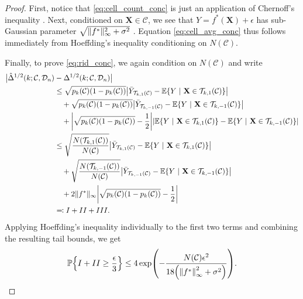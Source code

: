 \documentclass[11pt]{article}
\newcommand{\bX}{\mathbf{X}}
\DeclarePairedDelimiter{\braces}{\lbrace}{\rbrace}
\DeclarePairedDelimiter{\paren}{(}{)}
\DeclarePairedDelimiter{\abs}{|}{|}
\DeclarePairedDelimiter{\norm}{\|}{\|}
\renewcommand{\P}{\mathbb{P}}
\newcommand{\E}{\mathbb{E}}
\newcommand{\cell}{\mathcal{C}}
\newcommand{\data}[1][n]{\mathcal{D}_{#1}}
\newcommand{\splitoperator}{\mathcal{T}}
\newcommand{\rid}{\Delta^{1/2}}
\newcommand{\ridhat}{\hat\Delta^{1/2}}
\begin{document}
\begin{proof}
    First, notice that \eqref{eq:cell_count_conc} is just an application of Chernoff's inequality \citep{vershynin2018high}.
    Next, conditioned on $\bX \in \cell$, we see that $Y = f^*(\bX) + \epsilon$ has sub-Gaussian parameter $\sqrt{\norm{f^*}_\infty^2 + \sigma^2}$ \citep{wainwright2019high}.
    Equation \ref{eq:cell_avg_conc} thus follows immediately from Hoeffding's inequality conditioning on $N(\cell)$.
    
    Finally, to prove \eqref{eq:rid_conc}, we again condition on $N(\cell)$ and write
    \begin{equation} \nonumber
    \begin{split}
        \big|\ridhat(k;\cell,\data) & - \rid(k;\cell,\data)\big| \\
        & \leq \sqrt{p_k(\cell)(1-p_k(\cell))} \abs*{\bar Y_{\splitoperator_{k,1}(\cell)} - \E\braces*{Y~|~\bX \in \splitoperator_{k,1}(\cell)}} \\
        & \quad + \sqrt{p_k(\cell)(1-p_k(\cell))} \abs*{\bar Y_{\splitoperator_{k,-1}(\cell)} - \E\braces*{Y~|~\bX \in \splitoperator_{k,-1}(\cell)}} \\
        & \quad + \abs*{\sqrt{p_k(\cell)(1-p_k(\cell))} - \frac{1}{2}}\abs*{\E\braces*{Y~|~\bX \in \splitoperator_{k,1}(\cell)} - \E\braces*{Y~|~\bX \in \splitoperator_{k,-1}(\cell)}} \\
        & \leq \sqrt{\frac{N(\splitoperator_{k,1}(\cell))}{N(\cell)}}\abs*{\bar Y_{\splitoperator_{k,1}(\cell)} - \E\braces*{Y~|~\bX \in \splitoperator_{k,1}(\cell)}} \\
        & \quad + \sqrt{\frac{N(\splitoperator_{k,-1}(\cell))}{N(\cell)}}\abs*{\bar Y_{\splitoperator_{k,-1}(\cell)} - \E\braces*{Y~|~\bX \in \splitoperator_{k,-1}(\cell)}} \\
        & \quad + 2\norm{f^*}_\infty \abs*{\sqrt{p_k(\cell)(1-p_k(\cell))} - \frac{1}{2}} \\
        & \eqqcolon I + II + III.
    \end{split}
    \end{equation}
    Applying Hoeffding's inequality individually to the first two terms and combining the resulting tail bounds, we get
    \begin{equation} \label{eq:conc_eq1}
        \P\braces*{I + II \geq \frac{\epsilon}{3}} \leq 4\exp\paren*{-\frac{N(\cell)\epsilon^2}{18\paren*{\norm*{f^*}_\infty^2 + \sigma^2}}}.
    \end{equation}
    

\end{proof}
\end{document}
